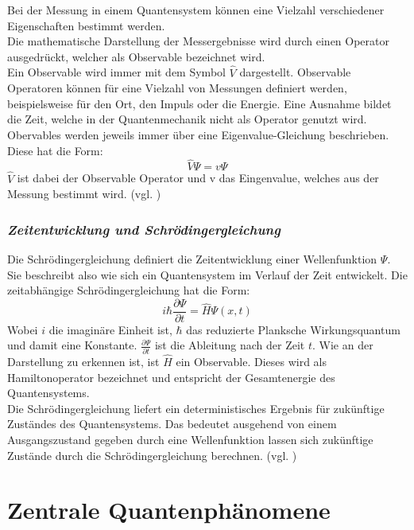 Bei der Messung in einem Quantensystem können eine Vielzahl verschiedener Eigenschaften bestimmt werden.\\
Die mathematische Darstellung der Messergebnisse  wird  durch einen Operator ausgedrückt, welcher als Observable bezeichnet wird.\\
Ein Observable wird immer mit dem Symbol $\hat{V}$ dargestellt.
Observable Operatoren können für eine Vielzahl von Messungen definiert werden, beispielsweise für den Ort, den Impuls oder die Energie. Eine Ausnahme bildet die Zeit, welche in der Quantenmechanik nicht als Operator genutzt wird.\\
Obervables werden jeweils immer über eine Eigenvalue-Gleichung beschrieben. Diese hat die Form:
\begin{equation*}
\hat{V} \Psi = v \Psi
\end{equation*}
$\hat{V}$ ist dabei der Observable Operator und v das Eingenvalue, welches aus der Messung bestimmt wird. (vgl. \cite[Ch. 1.9.1]{lvovsky_quantum_2018})

\subsubsection*{\textit{Zeitentwicklung und Schrödingergleichung}}
\label{Zeitentwicklung und Schrödingergleichung}

Die Schrödingergleichung definiert die Zeitentwicklung einer Wellenfunktion $\Psi$. Sie beschreibt also wie sich ein Quantensystem im Verlauf der Zeit entwickelt. Die zeitabhängige Schrödingergleichung hat die Form:
\begin{equation*}
i\hbar \frac{\partial \Psi}{\partial t} = \hat{H} \Psi(x,t)
\end{equation*}
Wobei $i$ die imaginäre Einheit ist, $\hbar$ das reduzierte Planksche Wirkungsquantum und damit eine Konstante. $\frac{\partial \Psi}{\partial t}$ ist die Ableitung nach der Zeit $t$. Wie an der Darstellung zu erkennen ist, ist $\hat{H}$ ein Observable. Dieses wird als Hamiltonoperator bezeichnet und entspricht der Gesamtenergie des Quantensystems.\\
Die Schrödingergleichung liefert ein deterministisches Ergebnis für zukünftige Zuständes des Quantensystems. Das bedeutet ausgehend von einem Ausgangszustand gegeben durch eine Wellenfunktion lassen sich zukünftige Zustände durch die Schrödingergleichung berechnen. (vgl. \cite[Ch. 4.1]{osada_introduction_2022})

\section{Zentrale Quantenphänomene }

